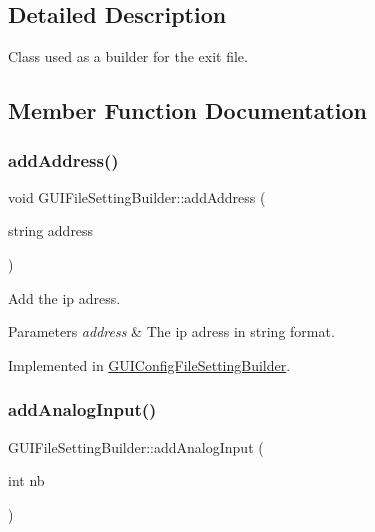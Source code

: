 \subsection{Detailed Description}
Class used as a builder for the exit file. 

\subsection{Member Function Documentation}
\mbox{\label{class_g_u_i_file_setting_builder_a4dff49cea1e4861e66ed57e258b702da}} 
\subsubsection{\texorpdfstring{add\+Address()}{addAddress()}}
{\footnotesize\ttfamily void G\+U\+I\+File\+Setting\+Builder\+::add\+Address (\begin{DoxyParamCaption}\item[{string}]{address }\end{DoxyParamCaption})\hspace{0.3cm}{\ttfamily [pure virtual]}}



Add the ip adress. 


\begin{DoxyParams}{Parameters}
{\em address} & The ip adress in string format. \\
\hline
\end{DoxyParams}


Implemented in \mbox{\hyperlink{class_g_u_i_config_file_setting_builder_abbaa15d81d247c3bca68a03e31b78e3e}{G\+U\+I\+Config\+File\+Setting\+Builder}}.

\mbox{\label{class_g_u_i_file_setting_builder_ac219ca2fecb545689b3e06857d77be73}} 
\subsubsection{\texorpdfstring{add\+Analog\+Input()}{addAnalogInput()}}
{\footnotesize\ttfamily G\+U\+I\+File\+Setting\+Builder\+::add\+Analog\+Input (\begin{DoxyParamCaption}\item[{int}]{nb }\end{DoxyParamCaption})\hspace{0.3cm}{\ttfamily [pure virtual]}}



